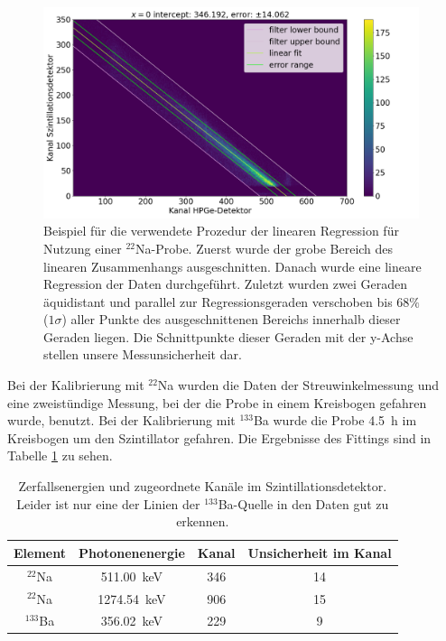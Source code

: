 \begin{figure}[ht]
	\centering
    \includegraphics[width=0.98\textwidth]{images/kali_szint_fit_Na22.png}
	\caption{Beispiel für die verwendete Prozedur der linearen Regression für Nutzung einer $^{22}$Na-Probe. Zuerst wurde der grobe Bereich des linearen Zusammenhangs ausgeschnitten. Danach wurde eine lineare Regression der Daten durchgeführt. Zuletzt wurden zwei Geraden äquidistant und parallel zur Regressionsgeraden verschoben bis $ 68 \% $ ($1 \sigma$) aller Punkte des ausgeschnittenen Bereichs innerhalb dieser Geraden liegen. Die Schnittpunkte dieser Geraden mit der y-Achse stellen unsere Messunsicherheit dar.}
	\label{kali_szint_bsp_fit}
\end{figure}

Bei der Kalibrierung mit $^{22}$Na wurden die Daten der Streuwinkelmessung und eine zweistündige Messung, bei der die Probe in einem Kreisbogen gefahren wurde, benutzt. Bei der Kalibrierung mit $^{133}$Ba wurde die Probe \SI{4.5}{\hour} im Kreisbogen um den Szintillator gefahren. Die Ergebnisse des Fittings sind in Tabelle \ref{kali_szint_Energien} zu sehen.

\begin{table}[h]
    \centering
    \begin{tabular}{|c | c | c | c|}
        \hline
        Element & Photonenenergie & Kanal & Unsicherheit im Kanal \\
        \hline
        $^{22}$Na & \SI{511.00}{\kilo\electronvolt} & 346 & 14 \\
        $^{22}$Na & \SI{1274.54}{\kilo\electronvolt} & 906 & 15 \\
        $^{133}$Ba & \SI{356.02}{\kilo\electronvolt} & 229 & 9 \\
        \hline
    \end{tabular}
    \caption{Zerfallsenergien und zugeordnete Kanäle im Szintillationsdetektor. Leider ist nur eine der Linien der $^{133}$Ba-Quelle in den Daten gut zu erkennen.}
    \label{kali_szint_Energien}
\end{table}

